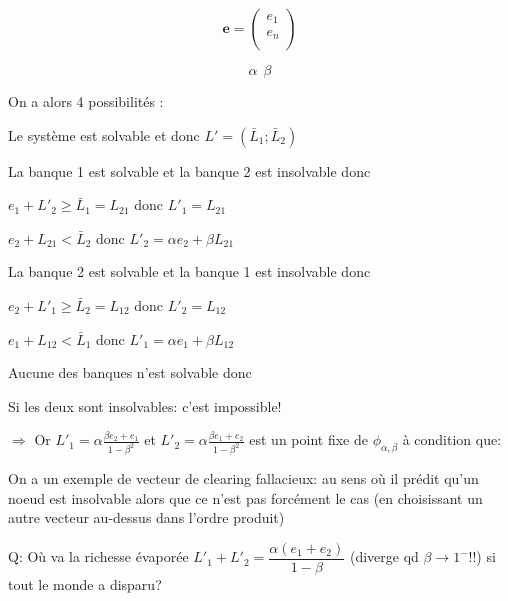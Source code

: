 \documentclass[11pt,oneside,twocolumn]{article}
\begin{document}
\begin{equation*}
\textbf{e} =
\begin{pmatrix}
e_{1} \\
e_{n} \\
\end{pmatrix}
\end{equation*}

\begin{equation*}
\alpha    \
\
\beta
\end{equation*}

On a alors 4 possibilités :

Le système est solvable et donc $L' = (\bar{L}_{1} ; \bar{L}_{2})$

La banque 1 est solvable et la banque 2 est insolvable donc
\begin{center}
$e_{1} + L'_{2} \geq \bar{L}_{1} = L_{21}$ donc $L'_{1} = L_{21}$

$e_{2} + L_{21} < \bar{L}_{2}$ donc $L'_{2} = \alpha e_{2} + \beta L_{21}$
\end{center}

La banque 2 est solvable et la banque 1 est insolvable donc
\begin{center}
$e_{2} + L'_{1} \geq \bar{L}_{2} = L_{12}$ donc $L'_{2} = L_{12}$

$e_{1} + L_{12} < \bar{L}_{1}$ donc $L'_{1} = \alpha e_{1} + \beta L_{12}$
\end{center}

Aucune des banques n'est solvable donc

Si les deux sont insolvables:
c'est impossible!

$\Longrightarrow$ Or $L'_{1} = \alpha \frac{\beta e_{2} + e_{1}}{1- \beta^{2}} $ et $L'_{2} = \alpha \frac{\beta e_{1} + e_{2}}{1 - \beta^{2}}$
est un point fixe de $\phi_{\alpha,\beta}$ à condition que:

On a un exemple de vecteur de clearing fallacieux: au sens où il prédit qu'un noeud est insolvable alors que ce n'est pas forcément le cas (en choisissant un autre vecteur au-dessus dans l'ordre produit)

Q: Où va la richesse évaporée
$L'_1+L'_2= \dfrac{\alpha(e_1+e_2)}{1-\beta}$ (diverge qd $\beta\to 1^-$!!)
si tout le monde a disparu?
\end{document}

